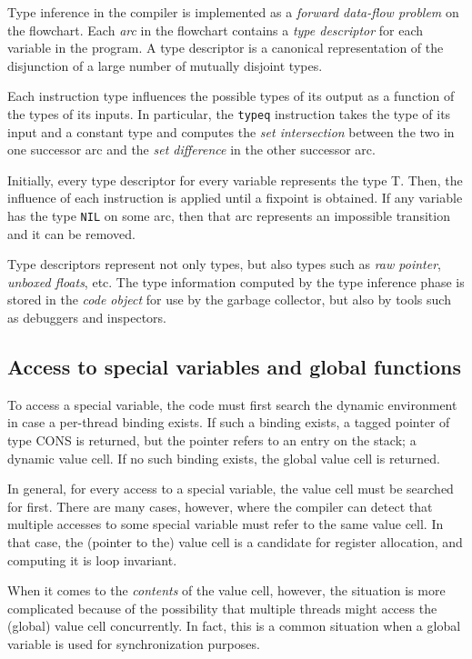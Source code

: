 Type inference in the \sysname{} compiler is implemented as a
\emph{forward data-flow problem} on the flowchart.  Each \emph{arc} in
the flowchart contains a \emph{type descriptor} for each variable in
the program.  A type descriptor is a canonical representation of the
disjunction of a large number of mutually disjoint types.  

Each instruction type influences the possible types of its output as a
function of the types of its inputs.  In particular, the
\texttt{typeq} instruction takes the type of its input and a constant
type and computes the \emph{set intersection}
between the two in one successor arc and the \emph{set difference} in
the other successor arc.  

Initially, every type descriptor for every variable represents the
type T.  Then, the influence of each instruction is applied until
a fixpoint is obtained.  If any variable has the type \texttt{NIL} on
some arc, then that arc represents an impossible transition and it can
be removed. 

Type descriptors represent not only \cl{} types, but also types such
as \emph{raw pointer}, \emph{unboxed floats}, etc.  The type
information computed by the type inference phase is stored in the
\emph{code object} for use by the garbage collector, but also by tools
such as debuggers and inspectors. 

\subsection{Access to special variables and global functions}

To access a special variable, the code must first search the dynamic
environment in case a per-thread binding exists.  If such a binding
exists, a tagged pointer of type CONS is returned, but the pointer
refers to an entry on the stack; a dynamic value cell.  If no such
binding exists, the global value cell is returned.

In general, for every access to a special variable, the value cell
must be searched for first.  There are many cases, however, where the
compiler can detect that multiple accesses to some special variable
must refer to the same value cell.  In that case, the (pointer to the)
value cell is a candidate for register allocation, and computing it is
loop invariant. 

When it comes to the \emph{contents} of the value cell, however, the
situation is more complicated because of the possibility that multiple
threads might access the (global) value cell concurrently.  In fact,
this is a common situation when a global variable is used for
synchronization purposes.

